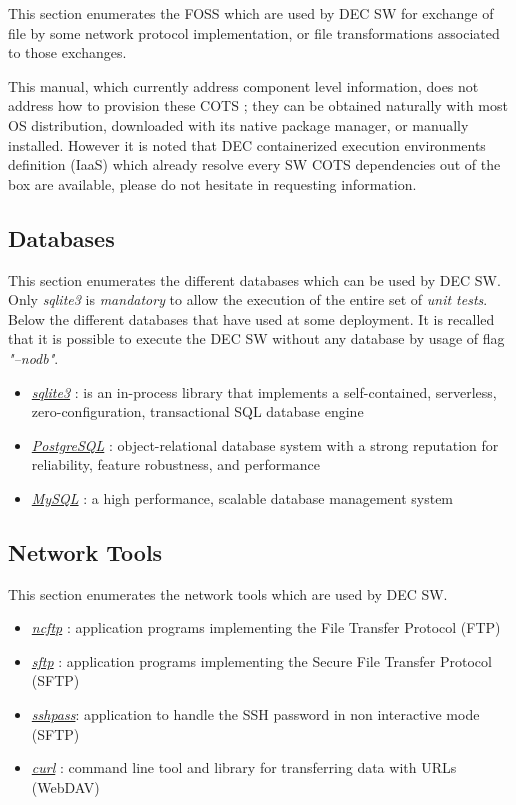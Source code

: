\documentclass[dec_sum_main.tex]{subfiles}
\begin{document}
This section enumerates the FOSS which are used by DEC SW for exchange of file by some network protocol implementation, or file transformations associated to those exchanges. \par\noindent


\par
\noindent
This manual, which currently address component level information, does not address how to provision these COTS ; they can be obtained naturally with most OS distribution, downloaded with its native package manager, or manually installed. However it is noted that DEC containerized execution environments definition (IaaS) which already resolve every SW COTS dependencies out of the box are available, please do not hesitate in requesting information.

\subsection{Databases}
This section enumerates the different databases which can be used by DEC SW. Only \textit{sqlite3} is \textit{mandatory} to allow the execution of the entire set of \textit{unit tests}. Below the different databases that have used at some deployment. It is recalled that it is possible to execute the DEC SW without any database by usage of flag \textit{"--nodb"}.
\par
\begin{itemize}
	\item \href{https://www.sqlite.org}{\textit{sqlite3}} : is an in-process library that implements a self-contained, serverless, zero-configuration, transactional SQL database engine
	\item \href{https://www.postgresql.org/}{\textit{PostgreSQL}} : object-relational database system with a strong reputation for reliability, feature robustness, and performance
	\item \href{https://www.mysql.com/}{\textit{MySQL}} : a high performance, scalable database management system
\end{itemize}

\subsection{Network Tools}
This section enumerates the network tools which are used by DEC SW.
\par
\begin{itemize}
	\item \href{https://www.ncftp.com}{\textit{ncftp}} : application programs implementing the File Transfer Protocol (FTP)
	\item \href{https://www.openssh.com}{\textit{sftp}} : application programs implementing the Secure File Transfer Protocol (SFTP)
    \item \href{https://linux.die.net/man/1/sshpass}{\textit{sshpass}}: application to handle the SSH password in non interactive mode (SFTP)
	\item \href{https://curl.haxx.se}{\textit{curl}} : command line tool and library for transferring data with URLs (WebDAV)
\end{itemize}
\end{document}

